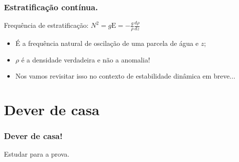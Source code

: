\begin{frame}
\frametitle{Estratificação contínua.}
  \begin{block}{}
  Frequência de estratificação: $N^2 = g\text{E} = -\frac{g}{\rho}\frac{d\rho}{dz}$
  \end{block}
  \pause
  \begin{itemize}[<+-| alert@+>]
    \item É a frequência natural de oscilação de uma parcela de água e $z$;
    \item $\rho$ é a densidade verdadeira e não a anomalia!
    \item Nos vamos revisitar isso no contexto de estabilidade dinâmica em
          breve...
  \end{itemize}
\end{frame}

\section{Dever de casa}
\begin{frame}
\frametitle{Dever de casa!}
    \begin{block}{}
        Estudar para a prova.
    \end{block}
    \vspace{0.3cm}
\end{frame}




